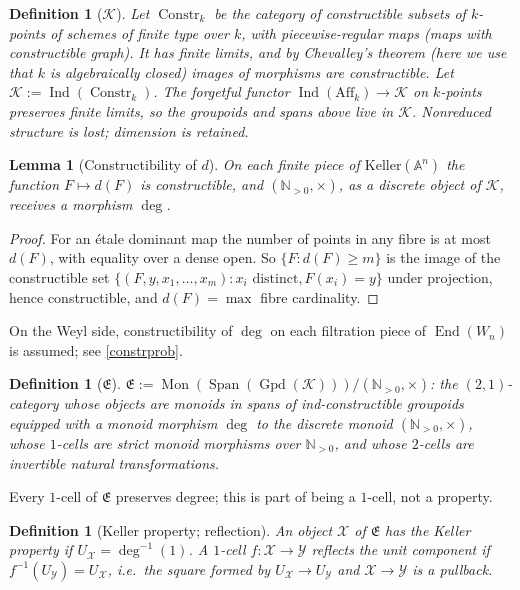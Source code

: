 \documentclass[11pt]{article}
\theoremstyle{change}
\newtheorem{definition}[equation]{Definition}
\newtheorem{lemma}[equation]{Lemma}
\theoremstyle{nonumberplain}
\newtheorem{proof}{Proof}
\newcommand\NN{{\mathbb N}}
\renewcommand\AA{{\mathbb A}}
\newcommand\cX{{\mathcal X}}
\newcommand\cY{{\mathcal Y}}
\newcommand\cK{{\mathcal K}}
\newcommand\fE{{\mathfrak E}}
\newcommand\setof[1]{\{ #1 \}}
\DeclareMathOperator{\End}{End}
\DeclareMathOperator{\Gpd}{Gpd}
\DeclareMathOperator{\Span}{Span}
\DeclareMathOperator{\Mon}{Mon}
\DeclareMathOperator{\Ind}{Ind}
\DeclareMathOperator{\Constr}{Constr}
\begin{document}
\begin{definition}[$\cK$]
Let $\Constr_k$ be the category of constructible subsets of $k$-points of schemes of finite type over $k$, with piecewise-regular maps (maps with constructible graph). It has finite limits, and by Chevalley's theorem (here we use that $k$ is algebraically closed) images of morphisms are constructible. Let $\cK := \Ind(\Constr_k)$. The forgetful functor $\Ind(\mathrm{Aff}_k) \to \cK$ on $k$-points preserves finite limits, so the groupoids and spans above live in $\cK$. Nonreduced structure is lost; dimension is retained.
\end{definition}

\begin{lemma}[Constructibility of $d$]
On each finite piece of $\mathrm{Keller}(\AA^n)$ the function $F \mapsto d(F)$ is constructible, and $(\NN_{>0}, \times)$, as a discrete object of $\cK$, receives a morphism $\deg$.
\end{lemma}

\begin{proof}
For an \'etale dominant map the number of points in any fibre is at most $d(F)$, with equality over a dense open. So $\setof{F : d(F) \geq m}$ is the image of the constructible set $\setof{(F, y, x_1, \dots, x_m) : x_i \text{ distinct}, F(x_i) = y}$ under projection, hence constructible, and $d(F) = \max$ fibre cardinality.
\end{proof}

On the Weyl side, constructibility of $\deg$ on each filtration piece of $\End(W_n)$ is assumed; see \cref{constrprob}.

\begin{definition}[$\fE$\label{fEdef}]
$\fE := \Mon(\Span(\Gpd(\cK))) / (\NN_{>0}, \times)$: the $(2,1)$-category whose objects are monoids in spans of ind-constructible groupoids equipped with a monoid morphism $\deg$ to the discrete monoid $(\NN_{>0}, \times)$, whose $1$-cells are strict monoid morphisms over $\NN_{>0}$, and whose $2$-cells are invertible natural transformations.
\end{definition}

Every $1$-cell of $\fE$ preserves degree; this is part of being a $1$-cell, not a property.

\begin{definition}[Keller property; reflection]
An object $\cX$ of $\fE$ has the \emph{Keller property} if $U_\cX = \deg^{-1}(1)$. A $1$-cell $f : \cX \to \cY$ \emph{reflects the unit component} if $f^{-1}(U_\cY) = U_\cX$, i.e.\ the square formed by $U_\cX \to U_\cY$ and $\cX \to \cY$ is a pullback.
\end{definition}
\end{document}
